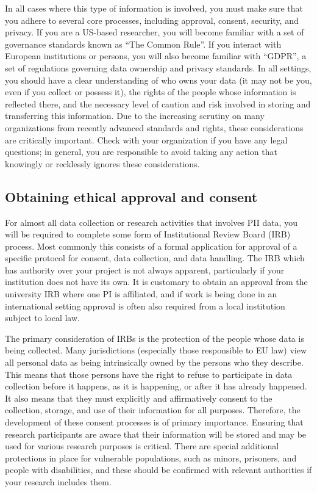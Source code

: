 In all cases where this type of information is involved,
you must make sure that you adhere to several core processes,
including approval, consent, security, and privacy.
If you are a US-based researcher, you will become familiar
with a set of governance standards known as ``The Common Rule''.
If you interact with European institutions or persons,
you will also become familiar with ``GDPR'',
a set of regulations governing data ownership and privacy standards.
In all settings, you should have a clear understanding of
who owns your data (it may not be you, even if you collect or possess it),
the rights of the people whose information is reflected there,
and the necessary level of caution and risk involved in
storing and transferring this information.
Due to the increasing scrutiny on many organizations
from recently advanced standards and rights,
these considerations are critically important.
Check with your organization if you have any legal questions;
in general, you are responsible to avoid taking any action that
knowingly or recklessly ignores these considerations.

\subsection{Obtaining ethical approval and consent}

For almost all data collection or research activities that involves PII data,
you will be required to complete some form of Institutional Review Board (IRB) process.
Most commonly this consists of a formal application for approval of a specific
protocol for consent, data collection, and data handling.
The IRB which has authority over your project is not always apparent,
particularly if your institution does not have its own.
It is customary to obtain an approval from the university IRB where one PI is affiliated,
and if work is being done in an international setting approval is often also required
from a local institution subject to local law.

The primary consideration of IRBs is the protection of the people whose data is being collected.
Many jurisdictions (especially those responsible to EU law) view all personal data
as being intrinsically owned by the persons who they describe.
This means that those persons have the right to refuse to participate in data collection
before it happens, as it is happening, or after it has already happened.
It also means that they must explicitly and affirmatively consent
to the collection, storage, and use of their information for all purposes.
Therefore, the development of these consent processes is of primary importance.
Ensuring that research participants are aware that their information
will be stored and may be used for various research purposes is critical.
There are special additional protections in place for vulnerable populations,
such as minors, prisoners, and people with disabilities,
and these should be confirmed with relevant authorities if your research includes them.

